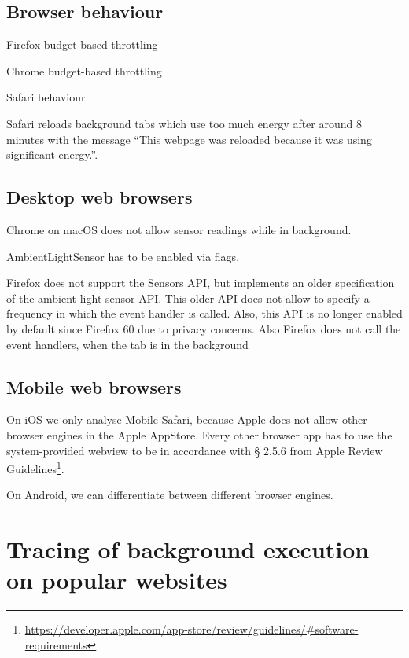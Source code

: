 \documentclass[article,type=bsc,colorback,accentcolor=tud9c]{tudthesis}
\begin{document}
  
  \newpage

  \subsection{Browser behaviour}


  Firefox budget-based throttling
  \autocite{mdn-page-visibility}

  Chrome budget-based throttling
  \autocite{chrome-background-tabs}

  Safari behaviour

  
  
  Safari reloads background tabs which use too much energy after around 8 minutes with the message ``This webpage was reloaded because it was using significant energy.''.

 
  
  \subsection{Desktop web browsers}

  Chrome on macOS does not allow sensor readings while in background.

  AmbientLightSensor has to be enabled via flags.
  

  Firefox does not support the Sensors API, but implements an older specification of the ambient light sensor API. This older API does not allow to specify a frequency in which the event handler is called. Also, this API is no longer enabled by default since Firefox 60 due to privacy concerns. Also Firefox does not call the event handlers, when the tab is in the background


  \subsection{Mobile web browsers}

  On iOS we only analyse Mobile Safari, because Apple does not allow other browser engines in the Apple AppStore. Every other browser app has to use the system-provided webview to be in accordance with § 2.5.6 from Apple Review Guidelines\footnote{\url{https://developer.apple.com/app-store/review/guidelines/\#software-requirements}}.

  On Android, we can differentiate between different browser engines.


  \newpage
  \section{Tracing of background execution on popular websites}
\end{document}
